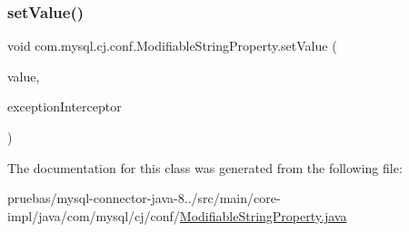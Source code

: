 \subsubsection{\texorpdfstring{set\+Value()}{setValue()}\hspace{0.1cm}{\footnotesize\ttfamily [2/2]}}
{\footnotesize\ttfamily void com.\+mysql.\+cj.\+conf.\+Modifiable\+String\+Property.\+set\+Value (\begin{DoxyParamCaption}\item[{String}]{value,  }\item[{\mbox{\hyperlink{interfacecom_1_1mysql_1_1cj_1_1exceptions_1_1_exception_interceptor}{Exception\+Interceptor}}}]{exception\+Interceptor }\end{DoxyParamCaption})}



The documentation for this class was generated from the following file\+:\begin{DoxyCompactItemize}
\item 
pruebas/mysql-\/connector-\/java-\/8../src/main/core-\/impl/java/com/mysql/cj/conf/\mbox{\hyperlink{_modifiable_string_property_8java}{Modifiable\+String\+Property.\+java}}\end{DoxyCompactItemize}
